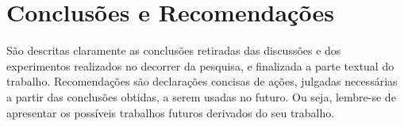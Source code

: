 \chapter{Conclusões e Recomendações}
\label{cap:05}

São descritas claramente as conclusões retiradas das discussões e dos experimentos realizados no decorrer da pesquisa, e finalizada a parte textual do trabalho. Recomendações são declarações concisas de ações, julgadas necessárias a partir das conclusões obtidas, a serem usadas no futuro. Ou seja, lembre-se de apresentar os possíveis trabalhos futuros derivados do seu trabalho.